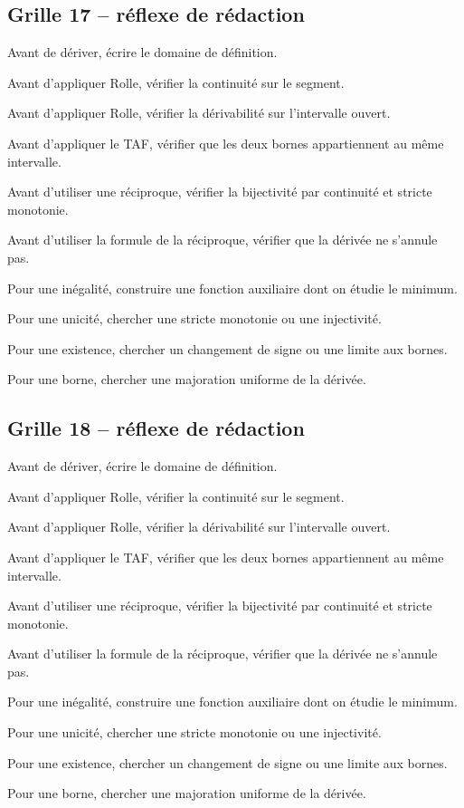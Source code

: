 \documentclass[11pt,a4paper]{article}
\begin{document}
\subsection*{Grille 17 -- réflexe de rédaction}

\begin{methodebox}

Avant de dériver, écrire le domaine de définition.

Avant d'appliquer Rolle, vérifier la continuité sur le segment.

Avant d'appliquer Rolle, vérifier la dérivabilité sur l'intervalle ouvert.

Avant d'appliquer le TAF, vérifier que les deux bornes appartiennent au même intervalle.

Avant d'utiliser une réciproque, vérifier la bijectivité par continuité et stricte monotonie.

Avant d'utiliser la formule de la réciproque, vérifier que la dérivée ne s'annule pas.

Pour une inégalité, construire une fonction auxiliaire dont on étudie le minimum.

Pour une unicité, chercher une stricte monotonie ou une injectivité.

Pour une existence, chercher un changement de signe ou une limite aux bornes.

Pour une borne, chercher une majoration uniforme de la dérivée.

\end{methodebox}

\subsection*{Grille 18 -- réflexe de rédaction}

\begin{methodebox}

Avant de dériver, écrire le domaine de définition.

Avant d'appliquer Rolle, vérifier la continuité sur le segment.

Avant d'appliquer Rolle, vérifier la dérivabilité sur l'intervalle ouvert.

Avant d'appliquer le TAF, vérifier que les deux bornes appartiennent au même intervalle.

Avant d'utiliser une réciproque, vérifier la bijectivité par continuité et stricte monotonie.

Avant d'utiliser la formule de la réciproque, vérifier que la dérivée ne s'annule pas.

Pour une inégalité, construire une fonction auxiliaire dont on étudie le minimum.

Pour une unicité, chercher une stricte monotonie ou une injectivité.

Pour une existence, chercher un changement de signe ou une limite aux bornes.

Pour une borne, chercher une majoration uniforme de la dérivée.

\end{methodebox}
\end{document}
